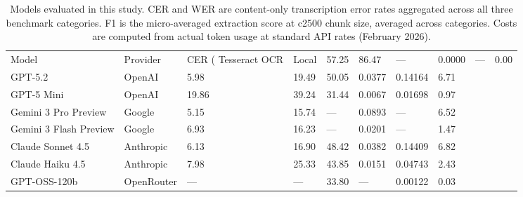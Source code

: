 \begin{table}
\caption{Models evaluated in this study. CER and WER are content-only transcription error rates aggregated across all three benchmark categories. F1 is the micro-averaged extraction score at c2500 chunk size, averaged across categories. Costs are computed from actual token usage at standard API rates (February 2026).}
\label{tab:paper_table_1}
\begin{tabular}{llllllll}
\toprule
Model & Provider & CER (%
\midrule
Tesseract OCR & Local & 57.25 & 86.47 & — & 0.0000 & — & 0.00 \\
GPT-5.2 & OpenAI & 5.98 & 19.49 & 50.05 & 0.0377 & 0.14164 & 6.71 \\
GPT-5 Mini & OpenAI & 19.86 & 39.24 & 31.44 & 0.0067 & 0.01698 & 0.97 \\
Gemini 3 Pro Preview & Google & 5.15 & 15.74 & — & 0.0893 & — & 6.52 \\
Gemini 3 Flash Preview & Google & 6.93 & 16.23 & — & 0.0201 & — & 1.47 \\
Claude Sonnet 4.5 & Anthropic & 6.13 & 16.90 & 48.42 & 0.0382 & 0.14409 & 6.82 \\
Claude Haiku 4.5 & Anthropic & 7.98 & 25.33 & 43.85 & 0.0151 & 0.04743 & 2.43 \\
GPT-OSS-120b & OpenRouter & — & — & 33.80 & — & 0.00122 & 0.03 \\
\bottomrule
\end{tabular}
\end{table}
